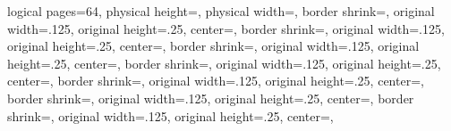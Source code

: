 %
%
%
%
%
%
%

{%
	\edef\pgfpageoptionheight{\the\paperheight}%
	\edef\pgfpageoptionwidth{\the\paperwidth}%
	\edef\pgfpageoptionborder{1pt}%
}%
{
  \pgfpagesphysicalpageoptions%
  {%
    logical pages=64,%
    physical height=\pgfpageoptionheight,%
    physical width=\pgfpageoptionwidth,%
  }%
%
%
  {%
    border shrink=\pgfpageoptionborder,%
    original width=.125\pgfpageoptionheight,%
    original height=.25\pgfpageoptionwidth,%
	center=\pgfpoint{0pt}{\pgfphysicalheight},%
  }%
  {%
    border shrink=\pgfpageoptionborder,%
    original width=.125\pgfpageoptionheight,%
    original height=.25\pgfpageoptionwidth,%
	center=\pgfpoint{.25\pgfphysicalwidth}{\pgfphysicalheight},%
  }%
  {%
    border shrink=\pgfpageoptionborder,%
    original width=.125\pgfpageoptionheight,%
    original height=.25\pgfpageoptionwidth,%
	center=\pgfpoint{.5\pgfphysicalwidth}{\pgfphysicalheight},%
  }%
  {%
    border shrink=\pgfpageoptionborder,%
    original width=.125\pgfpageoptionheight,%
    original height=.25\pgfpageoptionwidth,%
	center=\pgfpoint{.75\pgfphysicalwidth}{\pgfphysicalheight},%
  }%
  {%
  	border shrink=\pgfpageoptionborder,%
  	original width=.125\pgfpageoptionheight,%
  	original height=.25\pgfpageoptionwidth,%
	center=\pgfpoint{0pt}{.875\pgfphysicalheight},%
  }%
  {%
	border shrink=\pgfpageoptionborder,%
	original width=.125\pgfpageoptionheight,%
	original height=.25\pgfpageoptionwidth,%
	center=\pgfpoint{.25\pgfphysicalwidth}{.875\pgfphysicalheight},%
  }%
  {%
	border shrink=\pgfpageoptionborder,%
	original width=.125\pgfpageoptionheight,%
	original height=.25\pgfpageoptionwidth,%
	center=\pgfpoint{.5\pgfphysicalwidth}{.875\pgfphysicalheight},%
}}
